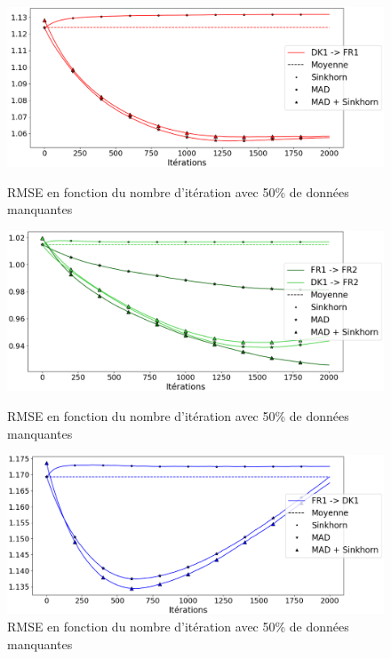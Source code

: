 \documentclass[acmsmall, natbib=false, nonacm]{acmart}
\begin{document}
\begin{figure}[H]
	\begin{minipage}[b]{0.4\linewidth}
		\centering \includegraphics[scale=0.14]{images/50_biais_FR1.png}
		\caption{RMSE en fonction du nombre d'itération avec 50\% de données manquantes}
	\end{minipage}\hfill
    \begin{minipage}[b]{0.4\linewidth}
		\centering \includegraphics[scale=0.14]{images/50_biais_FR2.png}
		\caption{RMSE en fonction du nombre d'itération avec 50\% de données manquantes}
	\end{minipage}\hfill
    \begin{minipage}[b]{0.4\linewidth}
		\centering \includegraphics[scale=0.14]{images/50_biais_DK1.png}
		\caption{RMSE en fonction du nombre d'itération avec 50\% de données manquantes}
	\end{minipage}\hfill

\end{figure}
\end{document}
